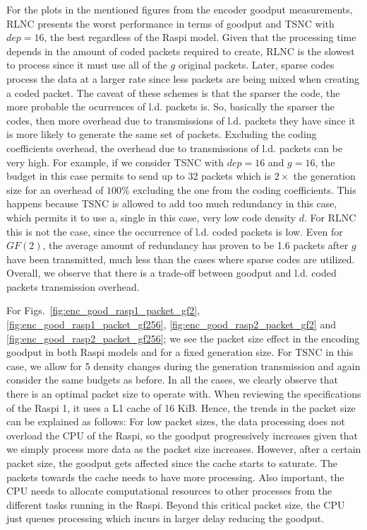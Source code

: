 For the plots in the mentioned figures from the encoder goodput measurements,
\ac{RLNC} presents the worst performance in terms of goodput and
\ac{TSNC} with $dep = 16$, the best regardless of the \ac{Raspi} model.
Given that the processing time depends in the amount of coded packets
required to create, \ac{RLNC} is the slowest to process since it must
use all of the $g$ original packets. Later, sparse codes process the data
at a larger rate since less packets are being mixed when creating a
coded packet. The caveat of these schemes is that the sparser the code,
the more probable the ocurrences of \ac{l.d.} packets is. So, basically
the sparser the codes, then more overhead due to transmissions of \ac{l.d.}
packets they have since it is more likely to generate the same set of
packets. Excluding the coding coefficients overhead, the overhead due to
transmissions of \ac{l.d.} packets can be very high.
For example, if we consider \ac{TSNC} with $dep=16$ and $g = 16$, the budget
in this case permits to send up to 32 packets which is $2\times$ the generation
size for an overhead of $100\%$ excluding the one from the coding
coefficients. This happens because \ac{TSNC} is allowed to add too much
redundancy in this case, which permits it to use a, single in this case,
very low code density $d$. For \ac{RLNC} this is not the case, since the
occurrence of \ac{l.d.} coded packets is low. Even for $GF(2)$, the
average amount of redundancy has proven to be 1.6 packets after $g$ have
been transmitted, much less than the cases where sparse codes are
utilized. Overall, we observe that there is a trade-off between goodput
and \ac{l.d.} coded packets transmission overhead.

For Figs.~\ref{fig:enc_good_rasp1_packet_gf2},
\ref{fig:enc_good_rasp1_packet_gf256}, \ref{fig:enc_good_rasp2_packet_gf2}
and \ref{fig:enc_good_rasp2_packet_gf256}; we see the packet
size effect in the encoding goodput in both \ac{Raspi} models and for
a fixed generation size. For \ac{TSNC} in this case, we allow for 5 density
changes during the generation transmission and again consider the same
budgets as before. In all the cases, we clearly observe that there is an
optimal packet size to operate with. When reviewing the specifications
of the \ac{Raspi} 1, it uses a L1 cache of 16 KiB. Hence, the trends
in the packet size can be explained as follows: For low packet sizes,
the data processing does not overload the \ac{CPU} of the \ac{Raspi}, so
the goodput progressively increases given that we simply process more
data as the packet size increases. However, after a certain packet size,
the goodput gets affected since the cache starts to saturate. The packets
towards the cache needs to have more processing. Also important, the
\ac{CPU} needs to allocate computational resources to other processes from
the different tasks running in the \ac{Raspi}. Beyond this critical packet
size, the \ac{CPU} just queues processing which incurs in larger delay
reducing the goodput.

